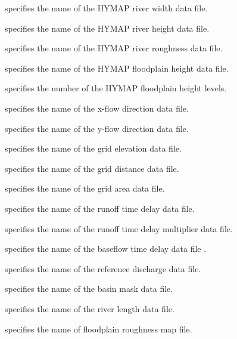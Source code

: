 
 specifies the name of the HYMAP river width data file.

 specifies the name of the HYMAP river height data file. 

 specifies the name of the HYMAP river roughness data file. 

 specifies the name of the HYMAP floodplain height data file. 

 specifies the number of the HYMAP floodplain height levels. 

 specifies the name of the x-flow direction data file.

 specifies the name of the y-flow direction data file.

 specifies the name of the grid elevation data file.

 specifies the name of the grid distance data file.

 specifies the name of the grid area data file.

  

  

 specifies the name of the runoff time delay data file. 

 specifies the name of the runoff time delay multiplier data file.

 specifies the name of the baseflow time delay data file .

 specifies the name of the reference discharge data file.

 specifies the name of the basin mask data file.

  

  

 specifies the name of the river length data file.

 specifies the name of floodplain roughness map file.

